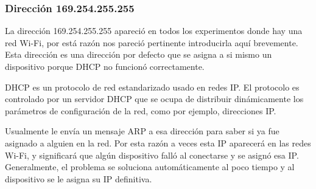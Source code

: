 \subsubsection{Dirección 169.254.255.255}

La dirección 169.254.255.255 apareció en todos los experimentos donde hay una red Wi-Fi, por está razón nos pareció pertinente introducirla aquí brevemente. Esta dirección es una dirección por defecto que se asigna a si mismo un dispositivo porque DHCP no funcionó correctamente.

DHCP \cite{dhcp} es un protocolo de red estandarizado usado en redes IP. El protocolo es controlado por un servidor DHCP que se ocupa de distribuir dinámicamente los parámetros de configuración de la red, como por ejemplo, direcciones IP.


Usualmente le envía un mensaje ARP a esa dirección para saber si ya fue asignado a alguien en la red. Por esta razón a veces esta IP aparecerá en las redes Wi-Fi, y significará que algún dispositivo falló al conectarse y se asignó esa IP. Generalmente, el problema se soluciona automáticamente al poco tiempo y al dispositivo se le asigna su IP definitiva.


